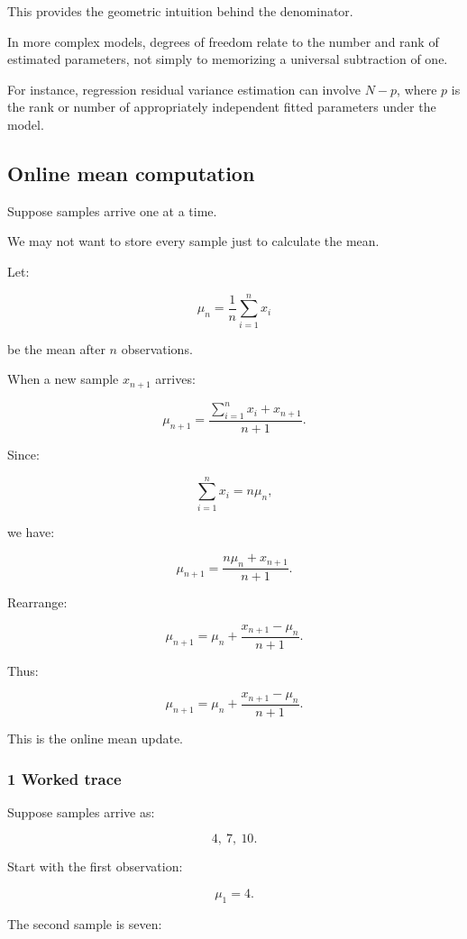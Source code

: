 This provides the geometric intuition behind the denominator.

In more complex models, degrees of freedom relate to the number and rank of estimated parameters, not simply to memorizing a universal subtraction of one.

For instance, regression residual variance estimation can involve \(N-p\), where \(p\) is the rank or number of appropriately independent fitted parameters under the model.

\subsection{Online mean computation}\label{02-foundations-ii-ch030-online-mean-computation}

Suppose samples arrive one at a time.

We may not want to store every sample just to calculate the mean.

Let:

\[
 \mu_n= \frac1n\sum_{i=1}^{n}x_i
\]

be the mean after \(n\) observations.

When a new sample \(x_{n+1}\) arrives:

\[
 \mu_{n+1} = \frac{ \sum_{i=1}^{n}x_i+x_{n+1} }{ n+1 }.
\]

Since:

\[
 \sum_{i=1}^{n}x_i=n\mu_n,
\]

we have:

\[
 \mu_{n+1} = \frac{n\mu_n+x_{n+1}}{n+1}.
\]

Rearrange:

\[
 \mu_{n+1} = \mu_n+ \frac{x_{n+1}-\mu_n}{n+1}.
\]

Thus:

\[
 \boxed{ \mu_{n+1} = \mu_n+ \frac{x_{n+1}-\mu_n}{n+1} }.
\]

This is the online mean update.

\subsubsection{1 Worked trace}\label{02-foundations-ii-ch030-worked-trace}

Suppose samples arrive as:

\[
 4,\ 7,\ 10.
\]

Start with the first observation:

\[
 \mu_1=4.
\]

The second sample is seven:

